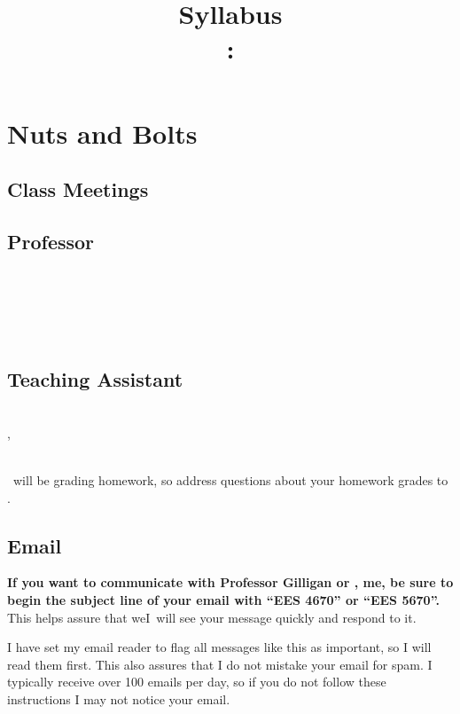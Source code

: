 \documentclass[11pt,twoside]{jgsyllabus}\usepackage[]{graphicx}\usepackage[]{xcolor}
\title{Syllabus\\
\ShortCourseNumber: \LongCourseName}
\begin{document}
\maketitle

\iffalse
\noindent
\textbf{\large \textsc{Note:} This is a draft syllabus, subject to change.}

\fi
\section[Nuts \& Bolts]{Nuts and Bolts}
\label{sec:NutsAndBolts}
\subsection{Class Meetings}
\ClassMeetings
\subsection{Professor}
\label{sec:Professor}
\ProfName\\
\ProfDescr\\
\ProfOffice\\
\ProfEmail\\
\ProfOfficeHours
%
\ifTA
\subsection{Teaching Assistant}
\label{sec:TA}
\TaName\\
\TaOfficeLoc\ifTaPhone , \TaPhone\fi\\
\TaEmail\\
\TaOfficeHours
\medskip

\noindent
\TaTitle\ will be grading homework, so address questions about your homework grades
to \TaAccusative.
\fi

\subsection{Email}
\textbf{%
If you want to communicate with
\ifTA
Professor Gilligan or \TaTitle,
\else
me,
\fi
be sure to begin the
subject line of your email with ``{\scshape EES 4670}'' or ``{\scshape EES 5670}''.
}%
This helps assure
that \ifTA we\else I\fi\ will see your message quickly and respond to it.

I have set my email reader to flag all messages like this as important, so I
will read them first. This also assures that I do not mistake your email for
spam. I typically receive over 100 emails per day, so if you do not follow these
instructions I may not notice your email.
\end{document}
